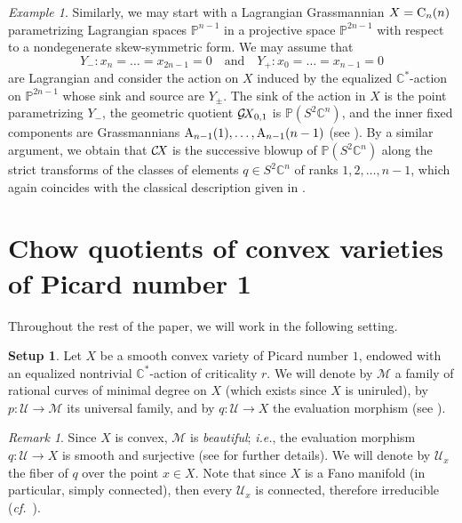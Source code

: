 \documentclass[10pt,a4paper]{article}
\numberwithin{equation}{section}
\theoremstyle{definition}
\newtheorem{setup}[theorem]{Setup}
\theoremstyle{remark}
\newtheorem{remark}[theorem]{Remark}
\newtheorem{example}[theorem]{Example}
\def\C{{\mathbb C}}
\def\P{{\mathbb P}}
\def\cM{{\mathcal M}}
\def\cU{{\mathcal U}}
\def\DA{{\rm A}}
\def\DC{{\rm C}}
\def\GX{\mathcal{G}\!X\hspace{-0.5pt}}
\def\CX{\mathcal{C}\!X\hspace{-0.5pt}}
\begin{document}
\begin{example}\label{ex:classicex3}
  Similarly, we may start with a Lagrangian Grassmannian $X=\DC_n(n)$ parametrizing Lagrangian spaces $\P^{n-1}$ in a projective space $\P^{2n-1}$ with respect to a nondegenerate skew-symmetric form. We may assume that
  \[
  Y_-:x_n=\dots=x_{2n-1}=0\quad\mbox{and}\quad Y_+:x_0=\dots=x_{n-1}=0 
  \]
  are Lagrangian and consider the action on $X$ induced by the equalized $\C^*$-action on $\P^{2n-1}$ whose sink and source are $Y_\pm$. The sink of the action in $X$ is the point parametrizing $Y_-$, the geometric quotient $\GX_{0,1}$ is $\P(S^2\C^n)$, and the inner fixed components are Grassmannians $\DA_{n-1}(1),\dots,\DA_{n-1}(n-1)$ (see \cite{FS}). By a similar argument, we obtain that $\CX$ is the successive blowup of $\P(S^2\C^n)$ along the strict transforms of the classes of elements $q\in S^2\C^n$ of ranks $1,2,\dots, n-1$, which again coincides with the classical description given in \cite{Vai82}. 
\end{example}


\section{Chow quotients of convex varieties of Picard number 1}\label{sec:boundaryprimal}

Throughout the rest of the paper, we will work in the following setting. 

\begin{setup}\label{set:main}
Let $X$ be a smooth convex variety of Picard number $1$, endowed with an equalized nontrivial $\C^*$-action of criticality $r$. 
We will denote by  $\cM$ a family of rational curves of minimal degree on $X$ (which exists since $X$ is uniruled), by $p\colon\cU \to \cM$ its universal family, and by $q\colon \cU \to X$ the evaluation morphism (see \cite[Proposition~II.2.11]{kollar}).
\end{setup}

\begin{remark}\label{rem:convexcurves}
Since $X$ is convex, $\cM$ is {\em beautiful}; \textit{i.e.}, the evaluation morphism $q\colon \cU \to X$ is smooth and surjective (see \cite[Section 2.7]{OS2} for further details). We will denote by $\cU_x$ the fiber of $q$ over the point $x \in X$. Note that since $X$ is a Fano manifold (in particular, simply connected), then  every $\cU_x$ is connected, therefore irreducible (\textit{cf.}~\cite[Proposition~1.6]{Kan5}). 
\end{remark}
\end{document}
